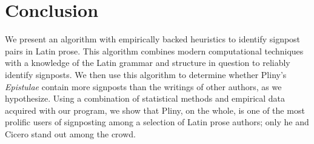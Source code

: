 \section{Conclusion}
\label{sec:conclusion}

We present an algorithm with empirically backed heuristics to identify signpost pairs in Latin prose. This algorithm combines modern computational techniques with a knowledge of the Latin grammar and structure in question to reliably identify signposts. We then use this algorithm to determine whether Pliny's \textit{Epistulae} contain more signposts than the writings of other authors, as we hypothesize. Using a combination of statistical methods and empirical data acquired with our program, we show that Pliny, on the whole, is one of the most prolific users of signposting among a selection of Latin prose authors; only he and Cicero stand out among the crowd.
